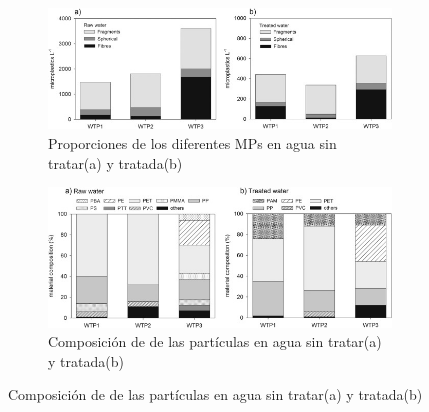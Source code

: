 \documentclass[a4paper,11pt]{article}
\begin{document}
	\begin{figure}[t!]
		\centering
		\begin{subfigure}[h]{0.45\textwidth}
			\includegraphics[width=1\textwidth]{proporcion.jpg}
			\caption{Proporciones de los diferentes MPs en agua sin tratar(a) y tratada(b)}
		\end{subfigure}
		\begin{subfigure}[h]{0.45\textwidth}
			\includegraphics[width=1\textwidth]{composicion.jpg}
			\caption{Composición de de las partículas en agua sin tratar(a) y tratada(b)}
		\end{subfigure}
		
	\end{figure}
	
\end{document}
